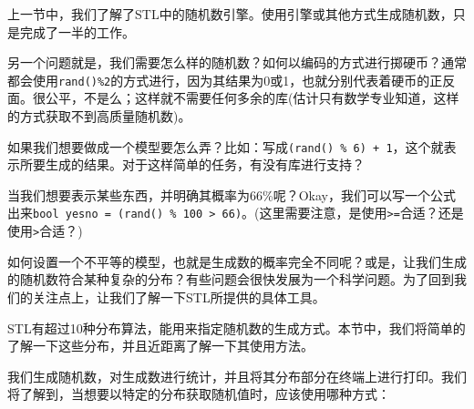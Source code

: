 上一节中，我们了解了STL中的随机数引擎。使用引擎或其他方式生成随机数，只是完成了一半的工作。

另一个问题就是，我们需要怎么样的随机数？如何以编码的方式进行掷硬币？通常都会使用\texttt{rand()\%2}的方式进行，因为其结果为0或1，也就分别代表着硬币的正反面。很公平，不是么；这样就不需要任何多余的库(估计只有数学专业知道，这样的方式获取不到高质量随机数)。

如果我们想要做成一个模型要怎么弄？比如：写成\texttt{(rand() \% 6) + 1}，这个就表示所要生成的结果。对于这样简单的任务，有没有库进行支持？

当我们想要表示某些东西，并明确其概率为66\%呢？Okay，我们可以写一个公式出来\texttt{bool yesno = (rand() \% 100 > 66)}。(这里需要注意，是使用\texttt{>=}合适？还是使用\texttt{>}合适？)

如何设置一个不平等的模型，也就是生成数的概率完全不同呢？或是，让我们生成的随机数符合某种复杂的分布？有些问题会很快发展为一个科学问题。为了回到我们的关注点上，让我们了解一下STL所提供的具体工具。

STL有超过10种分布算法，能用来指定随机数的生成方式。本节中，我们将简单的了解一下这些分布，并且近距离了解一下其使用方法。


我们生成随机数，对生成数进行统计，并且将其分布部分在终端上进行打印。我们将了解到，当想要以特定的分布获取随机值时，应该使用哪种方式：


